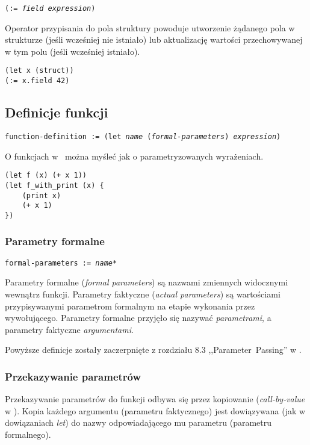 \texttt{(:= \emph{field} \emph{expression})}
\vspace{1em}

Operator przypisania do pola struktury powoduje utworzenie żądanego pola w strukturze (jeśli wcześniej nie
istniało) lub aktualizację wartości przechowywanej w tym polu (jeśli wcześniej istniało).

\begin{lstlisting}
(let x (struct))
(:= x.field 42)
\end{lstlisting}

\subsection{Definicje funkcji}

\texttt{function-definition := (let \emph{name} (\emph{formal-parameters}) \emph{expression})}
\vspace{1em}

O funkcjach w \ViuAct\ można myśleć jak o parametryzowanych wyrażeniach.

\begin{lstlisting}
(let f (x) (+ x 1))
(let f_with_print (x) {
    (print x)
    (+ x 1)
})
\end{lstlisting}

\subsubsection{Parametry formalne}

\texttt{formal-parameters := \emph{name}*}
\vspace{1em}

Parametry formalne (\emph{formal parameters}) są nazwami zmiennych widocznymi
wewnątrz funkcji. Parametry faktyczne (\emph{actual parameters}) są wartościami
przypisywanymi parametrom formalnym na etapie wykonania przez wywołującego.
Parametry formalne przyjęło się nazywać \emph{parametrami}, a parametry
faktyczne \emph{argumentami}.

Powyższe definicje zostały zaczerpnięte z rozdziału 8.3 ,,Parameter~Passing'' w
\cite{ProgrammingLanguagePragmatics}.

\subsubsection{Przekazywanie parametrów}

Przekazywanie parametrów do funkcji odbywa się przez kopiowanie
(\emph{call-by-value} w \cite{ProgrammingLanguagePragmatics}). Kopia każdego
argumentu (parametru faktycznego) jest dowiązywana (jak w dowiązaniach
\emph{let}) do nazwy odpowiadającego mu parametru (parametru formalnego).

